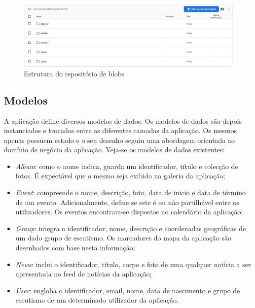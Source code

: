 \documentclass[12pt]{report}
\begin{document}
\bigskip
\begin{figure}[H]
    \centering
    \includegraphics[width=1\textwidth]{storage.jpg}
    \caption{Estrutura do repositório de \gls{blobs}}
\end{figure}

\subsection{Modelos}

A aplicação define diversos modelos de dados. Os modelos de dados são depois instanciados e trocados entre as diferentes camadas da aplicação. Os mesmos apenas possuem estado e o seu desenho seguiu uma abordagem orientada ao domínio de negócio da aplicação. Veja-se os modelos de dados existentes:

\begin{itemize}
    \item \emph{Album}: como o nome indica, guarda um identificador, título e colecção de fotos. É expectável que o mesmo seja exibido na galeria da aplicação;
    
    \item \emph{Event}: compreende o nome, descrição, foto, data de inicio e data de término de um evento. Adicionalmente, define se este é ou não partilhável entre os utilizadores. Os eventos encontram-se dispostos no calendário da aplicação;
    
    \item \emph{Group}: integra o identificador, nome, descrição e coordenadas geográficas de um dado grupo de escutismo. Os marcadores do mapa da aplicação são desenhados com base nesta informação;
    
    \item \emph{News}: inclui o identificador, título, corpo e foto de uma qualquer notícia a ser apresentada no feed de notícias da aplicação;
    
    \item \emph{User}: engloba o identificador, email, nome, data de nascimento e grupo de escutismo de um determinado utilizador da aplicação.
\end{itemize}
\end{document}
